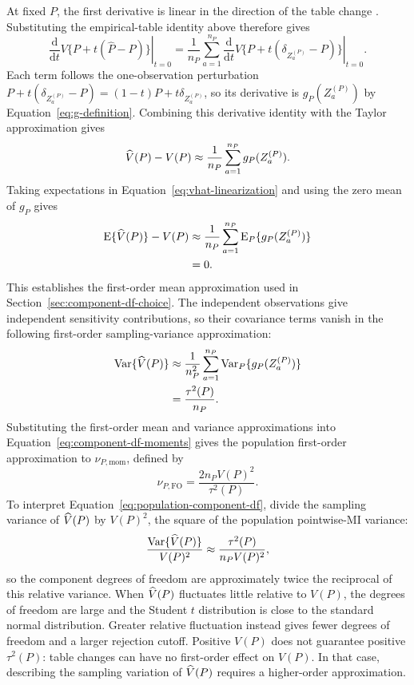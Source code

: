At fixed \(P\), the first derivative is linear in the direction of the
table change \citep[Chapter~20]{vanderVaart1998}. Substituting the
empirical-table identity above therefore gives
\begin{equation*}
  \left.\frac{\mathrm d}{\mathrm dt}
    V\{P+t(\widehat P-P)\}\right|_{t=0}
  =\frac{1}{n_P}\sum_{a=1}^{n_P}
    \left.\frac{\mathrm d}{\mathrm dt}
    V\{P+t(\delta_{Z_a^{(P)}}-P)\}\right|_{t=0}.
\end{equation*}
Each term follows the one-observation perturbation
\(P+t(\delta_{Z_a^{(P)}}-P)=(1-t)P+t\delta_{Z_a^{(P)}}\), so its
derivative is \(g_P(Z_a^{(P)})\) by Equation~\eqref{eq:g-definition}.
Combining this derivative identity with the Taylor approximation gives
\begin{equation}
  \widehat V(P)-V(P)
  \approx
  \frac{1}{n_P}
  \sum_{a=1}^{n_P}g_P(Z_a^{(P)}).
  \label{eq:vhat-linearization}
\end{equation}
Taking expectations in Equation~\eqref{eq:vhat-linearization} and using
the zero mean of \(g_P\) gives
\begin{align*}
  \operatorname{E}\{\widehat V(P)\}-V(P)
  &\approx\frac{1}{n_P}\sum_{a=1}^{n_P}
    \operatorname{E}_P\{g_P(Z_a^{(P)})\}\\
  &=0.
\end{align*}
This establishes the first-order mean approximation used in
Section~\ref{sec:component-df-choice}. The independent observations give
independent sensitivity contributions, so their covariance terms vanish
in the following first-order sampling-variance approximation:
\begin{align}
  \operatorname{Var}\{\widehat V(P)\}
  &\approx
  \frac{1}{n_P^2}
  \sum_{a=1}^{n_P}
  \operatorname{Var}_P\{g_P(Z_a^{(P)})\}\\*
  &=\frac{\tau^2(P)}{n_P}.
  \label{eq:vhat-sampling-variance}
\end{align}
Substituting the first-order mean and variance approximations into
Equation~\eqref{eq:component-df-moments} gives the population first-order
approximation to \(\nu_{P,\mathrm{mom}}\), defined by
\begin{equation}
  \boxed{
  \nu_{P,\mathrm{FO}}
  =
  \frac{2n_PV(P)^2}{\tau^2(P)}
  }.
  \label{eq:population-component-df}
\end{equation}
To interpret Equation~\eqref{eq:population-component-df}, divide the
sampling variance of \(\widehat V(P)\) by \(V(P)^2\), the square of the
population pointwise-MI variance:
\begin{equation}
  \frac{\operatorname{Var}\{\widehat V(P)\}}{V(P)^2}
  \approx \frac{\tau^2(P)}{n_PV(P)^2},
\end{equation}
so the component degrees of freedom are approximately twice the reciprocal
of this relative variance. When \(\widehat V(P)\) fluctuates little relative to
\(V(P)\), the degrees of freedom are large and the Student \(t\)
distribution is close to the standard normal distribution. Greater relative
fluctuation instead gives fewer degrees of freedom and a larger rejection
cutoff.
Positive \(V(P)\) does not guarantee positive \(\tau^2(P)\): table changes
can have no first-order effect on \(V(P)\). In that case, describing the
sampling variation of \(\widehat V(P)\) requires a higher-order approximation.

